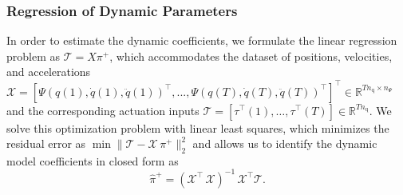 \subsubsection{Regression of Dynamic Parameters}\label{ssub:pcsregression:reg_dyn_params}
In order to estimate the dynamic coefficients, we formulate the linear regression problem as $\mathcal{T}=X \pi^+$, which accommodates the dataset of positions, velocities, and accelerations 
$\mathcal{X} = [\Psi(q(1), \dot{q}(1), \ddot{q}(1))^{\top},...,\Psi(q(T), \dot{q}(T), \ddot{q}(T))^{\top}]^{\top} \in \mathbb{R}^{T n_\mathrm{q} \times n_{\Psi}}$ 
and the corresponding actuation inputs 
$\mathcal{T}=[\tau^{\top}(1), \dots,\tau^{\top}(T)] \in \mathbb{R}^{T n_\mathrm{q}}$. 
We solve this optimization problem with linear least squares, which minimizes the residual error as $\min \lVert \mathcal{T} - \mathcal{X} \, \pi^+ \rVert_2^2$ and allows us to identify the dynamic model coefficients in closed form as
\begin{equation}
    \hat{\pi}^+ = (\mathcal{X}^{\top} \, \mathcal{X})^{-1} \, \mathcal{X}^{\top} \mathcal{T}.
\end{equation}


